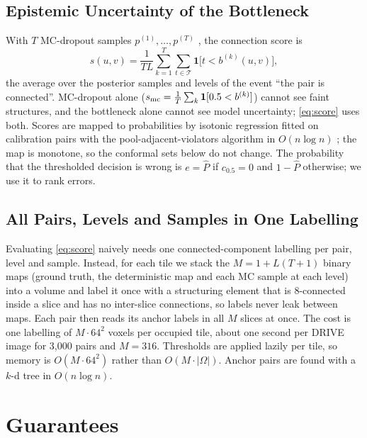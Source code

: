 \documentclass[10pt,letterpaper,journal]{IEEEtran}
\newcommand{\1}{\mathbf{1}}
\begin{document}
\subsection{Epistemic Uncertainty of the Bottleneck}
With $T$ MC-dropout samples $p^{(1)},\dots,p^{(T)}$ \cite{gal2016}, the connection score is
\begin{equation}\label{eq:score}
s(u,v)=\frac1{TL}\sum_{k=1}^T\sum_{t\in\mathcal T}\1\big[t<b^{(k)}(u,v)\big],
\end{equation}
the average over the posterior samples and levels of the event ``the pair is connected''. MC-dropout alone ($s_{\rm mc}=\frac1T\sum_k\1[0.5<b^{(k)}]$) cannot see faint structures, and the bottleneck alone cannot see model uncertainty; \eqref{eq:score} uses both. Scores are mapped to probabilities by isotonic regression fitted on calibration pairs with the pool-adjacent-violators algorithm in $O(n\log n)$ \cite{zadrozny2002}; the map is monotone, so the conformal sets below do not change. The probability that the thresholded decision is wrong is $e=\hat P$ if $c_{0.5}=0$ and $1-\hat P$ otherwise; we use it to rank errors.

\subsection{All Pairs, Levels and Samples in One Labelling}
Evaluating \eqref{eq:score} naively needs one connected-component labelling per pair, level and sample. Instead, for each tile we stack the $M=1+L(T+1)$ binary maps (ground truth, the deterministic map and each MC sample at each level) into a volume and label it once with a structuring element that is 8-connected inside a slice and has no inter-slice connections, so labels never leak between maps. Each pair then reads its anchor labels in all $M$ slices at once. The cost is one labelling of $M\cdot64^2$ voxels per occupied tile, about one second per DRIVE image for 3,000 pairs and $M=316$. Thresholds are applied lazily per tile, so memory is $O(M\cdot64^2)$ rather than $O(M\cdot|\Omega|)$. Anchor pairs are found with a $k$-d tree in $O(n\log n)$.

\section{Guarantees}\label{sec:guar}
\end{document}
